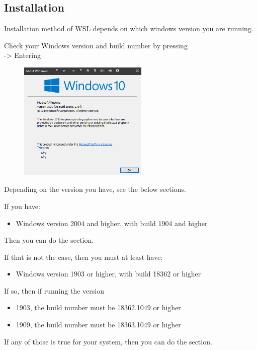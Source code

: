\subsection{Installation}

Installation method of WSL depends on which windows version you are running.

Check your Windows version and build number by pressing\\
 -> Entering 

\begin{figure}[H]
    \includegraphics[width=0.55\textwidth]{figures/windows_version.PNG}
\end{figure}

Depending on the version you have, see the below sections.

If you have:
\begin{itemize}
    \item Windows version 2004 and higher, with build 1904 and higher
\end{itemize}
Then you can do the  section.

If that is not the case, then you must at least have:
\begin{itemize}
    \item Windows version 1903 or higher, with build 18362 or higher
\end{itemize}

If so, then if running the version
\begin{itemize}
    \item 1903, the build number must be 18362.1049 or higher
    \item 1909, the build number must be 18363.1049 or higher
\end{itemize}

If any of those is true for your system, then you can do the  section.



